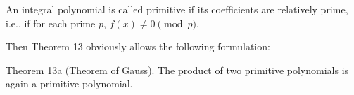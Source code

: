 An integral polynomial is called primitive if its coefficients are relatively prime, i.e., if for each prime $p$, $f(x) \neq 0 \pmod{p}$.

Then Theorem 13 obviously allows the following formulation:

Theorem 13a (Theorem of Gauss). The product of two primitive polynomials is again a primitive polynomial.
